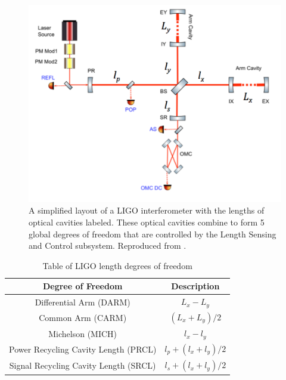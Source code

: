 \begin{figure}
\includegraphics[width=\textwidth]{figures/ODC/aligo-simple}
\caption[LIGO length degrees of freedom]{A simplified layout of a LIGO interferometer %
         with the lengths of optical cavities labeled. These optical cavities combine %
         to form 5 global degrees of freedom that are controlled by the Length Sensing %
         and Control subsystem. Reproduced from \cite{Kokeyama:detchar}.}
\label{fig:aligo-simple}
\end{figure}

\begin{table}[ht!]%
  \begin{center}
    \begin{tabular}{|c|c|}
    \hline
    Degree of Freedom & Description \\
    \hline
    Differential Arm (DARM) & $L_x - L_y$ \\
    \hline
    Common Arm (CARM) & $(L_x + L_y)/2$ \\
    \hline 
    Michelson (MICH) & $l_x - l_y$ \\
    \hline
    Power Recycling Cavity Length (PRCL) & $l_p + (l_x + l_y)/2$ \\
    \hline 
    Signal Recycling Cavity Length (SRCL) & $l_s + (l_x + l_y)/2$ \\
    \hline
    \end{tabular}
  \end{center}
  \caption[Table of LIGO degrees of freedom]{Table of LIGO length degrees of freedom}
  \label{table:aligo-dofs}
\end{table}


